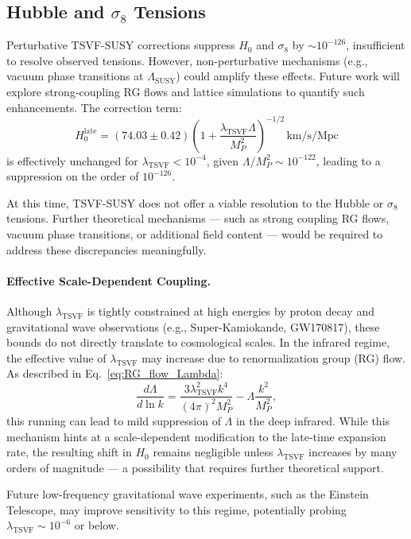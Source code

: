 \documentclass[twocolumn,superscriptaddress,floatfix]{revtex4-2}
\begin{document}
\subsection{Hubble and \texorpdfstring{$\sigma_8$}{sigma8} Tensions}
\label{subsec:hubble_sigma8_limitations}

Perturbative TSVF-SUSY corrections suppress \(H_0\) and \(\sigma_8\) by \(\sim 10^{-126}\), insufficient to resolve observed tensions. However, non-perturbative mechanisms (e.g., vacuum phase transitions at \(\Lambda_{\text{SUSY}}\)) could amplify these effects. Future work will explore strong-coupling RG flows and lattice simulations to quantify such enhancements. The correction term:
\[
H_0^{\text{late}} = (74.03 \pm 0.42)\left(1 + \frac{\lambda_{\text{TSVF}} \Lambda}{M_P^2} \right)^{-1/2} \, \text{km/s/Mpc}
\]
is effectively unchanged for \(\lambda_{\text{TSVF}} < 10^{-4}\), given \(\Lambda / M_P^2 \sim 10^{-122}\), leading to a suppression on the order of \(10^{-126}\).

At this time, TSVF-SUSY does not offer a viable resolution to the Hubble or \(\sigma_8\) tensions. Further theoretical mechanisms — such as strong coupling RG flows, vacuum phase transitions, or additional field content — would be required to address these discrepancies meaningfully.

\paragraph{Effective Scale-Dependent Coupling.}
Although \(\lambda_{\text{TSVF}}\) is tightly constrained at high energies by proton decay and gravitational wave observations (e.g., Super-Kamiokande, GW170817), these bounds do not directly translate to cosmological scales. In the infrared regime, the effective value of \(\lambda_{\text{TSVF}}\) may increase due to renormalization group (RG) flow. As described in Eq.~\eqref{eq:RG_flow_Lambda}:
\[
\frac{d\Lambda}{d \ln k} = \frac{3 \lambda^2_{\text{TSVF}} k^4}{(4\pi)^2 M_P^2} - \Lambda \frac{k^2}{M_P^2},
\]
this running can lead to mild suppression of \(\Lambda\) in the deep infrared. While this mechanism hints at a scale-dependent modification to the late-time expansion rate, the resulting shift in \(H_0\) remains negligible unless \(\lambda_{\text{TSVF}}\) increases by many orders of magnitude — a possibility that requires further theoretical support.

Future low-frequency gravitational wave experiments, such as the Einstein Telescope, may improve sensitivity to this regime, potentially probing \(\lambda_{\text{TSVF}} \sim 10^{-6}\) or below.
\end{document}
